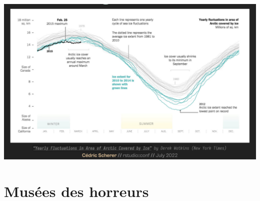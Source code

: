 \documentclass{beamer}
\begin{document}
\begin{frame}
\centering
\includegraphics[width=\textwidth,keepaspectratio]{img/good_viz.png}

\end{frame}






\section{Musées des horreurs}
\end{document}
